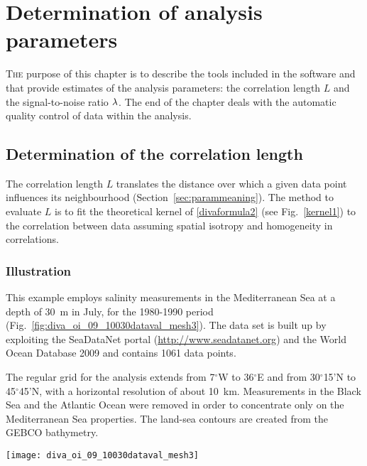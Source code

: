 \chapter[Determination of analysis parameters]{Determination of analysis parameters \label{chap:analysisparameters}}

\lettrine[lines=2]{T}{he} purpose of this chapter is to describe the tools included in the \diva software and that provide estimates of the analysis parameters: the correlation length $L$ and the signal-to-noise ratio $\lambda$. The end of the chapter deals with the automatic quality control of data within the analysis.

\minitoc


\section{Determination of the correlation length}
The correlation length $L$ translates the distance over which a given data point influences its neighbourhood (Section~\ref{sec:parammeaning}). The method to evaluate $L$ is to fit the theoretical kernel of \eqref{divaformula2} (see Fig.~\ref{kernel1}) to the correlation between data assuming spatial isotropy and homogeneity in correlations.

\subsection{Illustration\label{sec:medseaex}}

This example employs salinity measurements in the Mediterranean Sea at a depth of 30~m in July, for the 1980-1990 period (Fig.~\ref{fig:diva_oi_09_10030dataval_mesh3}). The data set is built up by exploiting the SeaDataNet portal (\url{http://www.seadatanet.org}) and the World Ocean Database 2009 \citep[WOD09,][]{BOYER09} and contains 1061 data points. 

The regular grid for the analysis extends from 7$^{\circ}$W to 36$^{\circ}$E and from 30$^{\circ}$15'N to 45$^{\circ}$45'N, with a horizontal resolution of about 10~km. Measurements in the Black Sea and the Atlantic Ocean were removed in order to concentrate only on the Mediterranean Sea properties. The land-sea contours are created from the GEBCO bathymetry.

\begin{figure*}[h!]
\centering
\texttt{[image: diva\_oi\_09\_10030dataval\_mesh3]}
\caption{Finite-element mesh and salinity measurements used for the application.\label{fig:diva_oi_09_10030dataval_mesh3}}
\end{figure*}

